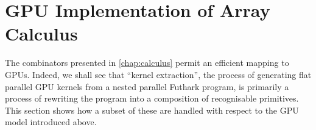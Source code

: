 \section{GPU Implementation of Array Calculus}
\label{sec:calculus-implementation}

The combinators presented in \cref{chap:calculus} permit an efficient
mapping to GPUs.  Indeed, we shall see that ``kernel extraction'', the
process of generating flat parallel GPU kernels from a nested parallel
Futhark program, is primarily a process of rewriting the program into
a composition of recognisable primitives.  This section shows how a
subset of these are handled with respect to the GPU model introduced
above.

